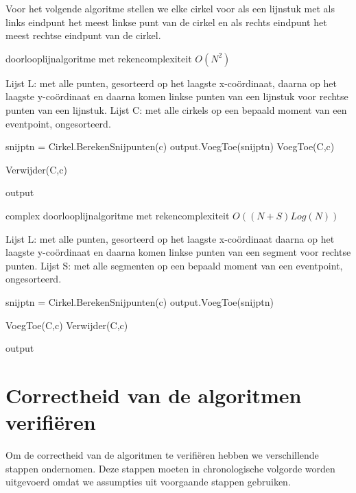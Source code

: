\documentclass[11pt,a4paper]{article}
\begin{document}
Voor het volgende algoritme stellen we elke cirkel voor als een lijnstuk met als links eindpunt het meest linkse punt van de cirkel en als rechts eindpunt het meest rechtse eindpunt van de cirkel.
\begin{algorithm}
\caption{doorlooplijnalgoritme met rekencomplexiteit $O(N^2)$}
\begin{algorithmic}
\State Lijst L: met alle punten, gesorteerd op het laagste x-co\"ordinaat, daarna op het laagste y-co\"ordinaat en daarna komen linkse punten van een lijnstuk voor rechtse punten van een lijnstuk.
\State Lijst C: met alle cirkels op een bepaald moment van een eventpoint, ongesorteerd.


	
		\State snijptn = Cirkel.BerekenSnijpunten(c)
		\State output.VoegToe(snijptn)	
		\State VoegToe(C,c)
		
	\EndIf
		\State Verwijder(C,c)
	\EndIf
\EndFor

\Return output
\end{algorithmic}
\end{algorithm}
\begin{algorithm}
\caption{complex doorlooplijnalgoritme met rekencomplexiteit $O((N+S)Log(N))$}
\begin{algorithmic}
\State Lijst L: met alle punten, gesorteerd op het laagste x-co\"ordinaat daarna op het laagste y-co\"ordinaat en daarna komen linkse punten van een segment voor rechtse punten.
\State Lijst S: met alle segmenten op een bepaald moment van een eventpoint, ongesorteerd.
	
		\State snijptn = Cirkel.BerekenSnijpunten(c)
		\State output.VoegToe(snijptn)
	
	\State VoegToe(C,c)
	\EndIf
	\State Verwijder(C,c)
	\EndIf
\EndFor

\Return output
\end{algorithmic}
\end{algorithm}

\section{Correctheid van de algoritmen verifi\"eren}

Om de correctheid van de algoritmen te verifi\"eren hebben we verschillende stappen ondernomen. Deze stappen moeten in chronologische volgorde worden uitgevoerd omdat we assumpties uit voorgaande stappen gebruiken.
\end{document}
